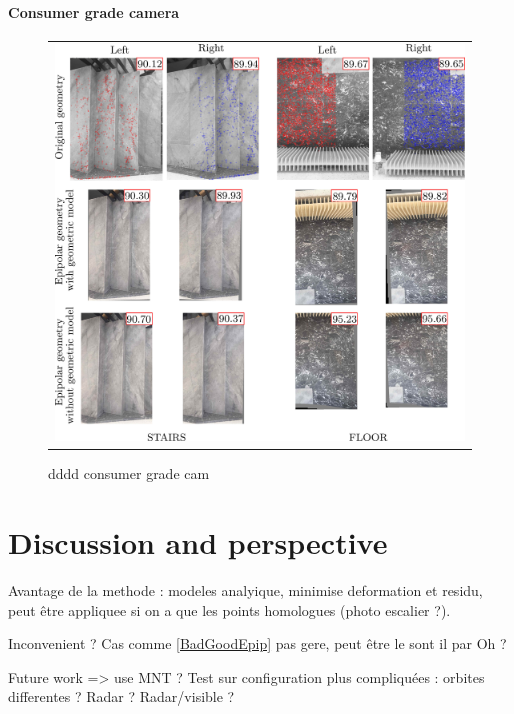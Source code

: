 \documentclass{ipol}
\begin{document}
\paragraph{Consumer grade camera}
\begin{figure}[h!]
\centering
\begin{tabular}{c}
\includegraphics[width=14cm]{FIGS/escalier_sol.jpeg}
\end{tabular}
\caption{dddd consumer grade cam}
 
\label{ExpConsumerCam}
\end{figure}

\section{Discussion and perspective}

Avantage de la methode : modeles analyique, minimise deformation et residu, peut être appliquee 
si on a que les points homologues (photo escalier ?).

Inconvenient ? Cas comme \ref{BadGoodEpip} pas gere, peut être le sont il par Oh ?

Future work => use MNT ? Test sur configuration plus compliquées : orbites differentes ? Radar ? Radar/visible ?
\end{document}
